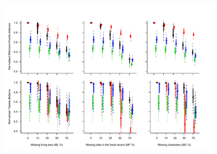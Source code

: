 \documentclass[12pt,letterpaper]{article}
\begin{document}
\newpage
\begin{figure}[!htbp]
\centering
    \includegraphics[width=1\textwidth]{Figures/In_main/AllMethods-RF+Tr-colour.pdf}
\caption{ }
\end{figure}
\end{document}
